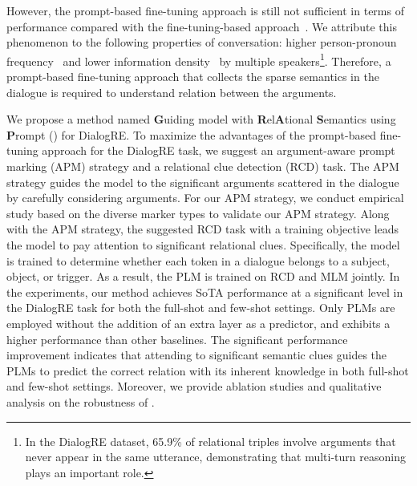 \documentclass[11pt]{article}
\begin{document}
However, the prompt-based fine-tuning approach is still not sufficient in terms of performance compared with the fine-tuning-based approach~\citep{han2021ptr,chen2021knowprompt}. We attribute this phenomenon to the following properties of conversation: higher person-pronoun frequency~\citep{wang2011pilot} and lower information density~\citep{biber1991variation} by multiple speakers\footnote{In the DialogRE dataset, 65.9\% of relational triples involve arguments that never appear in the same utterance, demonstrating that multi-turn reasoning plays an important role.}. Therefore, a prompt-based fine-tuning approach that collects the sparse semantics in the dialogue is required to understand relation between the arguments. 


We propose a method named \textbf{G}uiding model with \textbf{R}el\textbf{A}tional \textbf{S}emantics using \textbf{P}rompt () for DialogRE. To maximize the advantages of the prompt-based fine-tuning approach for the DialogRE task, we suggest an argument-aware prompt marking (APM) strategy and a relational clue detection (RCD) task. The APM strategy guides the model to the significant arguments scattered in the dialogue by carefully considering arguments. For our APM strategy, we conduct empirical study based on the diverse marker types to validate our APM strategy. Along with the APM strategy, the suggested RCD task with a training objective leads the model to pay attention to significant relational clues. Specifically, the model is trained to determine whether each token in a dialogue belongs to a subject, object, or trigger. As a result, the PLM is trained on RCD and MLM jointly. In the experiments, our method achieves SoTA performance at a significant level in the DialogRE task for both the full-shot and few-shot settings. Only PLMs are employed without the addition of an extra layer as a predictor, and  exhibits a higher performance than other baselines. The significant performance improvement indicates that attending to significant semantic clues guides the PLMs to predict the correct relation with its inherent knowledge in both full-shot and few-shot settings. Moreover, we provide ablation studies and qualitative analysis on the robustness of . 
\end{document}
